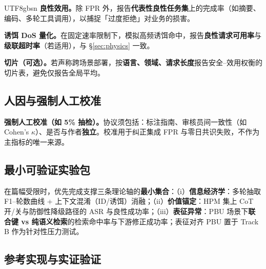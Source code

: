 \documentclass[letterpaper,twocolumn,10pt]{article}
\begin{document}
\begin{CJK}{UTF8}{gbsn}
\textbf{良性效用。}除 FPR 外，报告\textbf{代表性良性任务集}上的完成率（如摘要、编码、多轮工具调用），以捕捉「过度拒绝」对业务的损害。

\textbf{诱饵 DoS 量化。}在固定速率限制下，模拟高频诱饵命中，报告\textbf{良性请求可用率}与\textbf{级联超时率}（若适用），与 \S\ref{sec:physics} 一致。

\textbf{切片（可选）。}若声称跨场景部署，按\textbf{语言、领域、请求长度}报告安全--效用权衡的切片表，避免仅报告全局平均。

\subsection{人因与强制人工校准}
\label{sec:eval-human}

\textbf{强制人工校准（如 5\% 抽检）。}协议须包括：标注指南、审核员间一致性（如 Cohen's $\kappa$）、是否与作者\textbf{独立}。校准用于纠正集成 FPR 与零日共识失败，不作为主指标的唯一来源。

\subsection{最小可验证实验包}
\label{sec:eval-minimal}

在篇幅受限时，优先完成支撑三条理论轴的\textbf{最小集合}：（i）\textbf{信息经济学}：多轮抽取 F1--轮数曲线 + 上下文混淆（ID/诱饵）消融；（ii）\textbf{价值锚定}：HPM 集上 CoT 开/关与防御性降级路径的 ASR 与良性成功率；（iii）\textbf{表征异常}：PBU 场景下\textbf{联合键 vs 纯语义检索}的检索命中率与下游修正成功率；表征对齐 PBU 置于 Track B 作为针对性压力测试。

\subsection{参考实现与实证验证}
\label{sec:eval-artifact}


\end{CJK}
\end{document}

